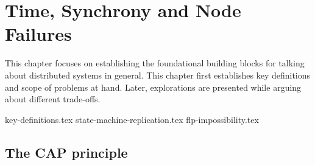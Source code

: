 \chapter{Time, Synchrony and Node Failures}

This chapter focuses on establishing the foundational building blocks for talking about distributed systems in general. This chapter first establishes key definitions and scope of problems at hand. Later, explorations are presented while arguing about different trade-offs.

{key-definitions.tex}
{state-machine-replication.tex}
{flp-impossibility.tex}

\section{The CAP principle}